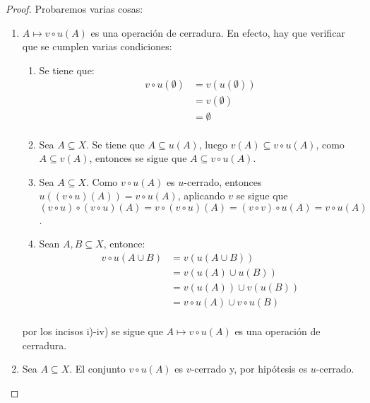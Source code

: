 \documentclass[12pt]{report}
\theoremstyle{largebreak}
\begin{document}
    \begin{proof}
        Probaremos varias cosas:
        \begin{enumerate}
            \item $A\mapsto v\circ u(A)$ es una operación de cerradura. En efecto, hay que verificar que se cumplen varias condiciones:
            \begin{enumerate}
                \item Se tiene que:
                \begin{equation*}
                    \begin{split}
                        v\circ u(\emptyset)&=v(u(\emptyset))\\
                        &=v(\emptyset)\\
                        &=\emptyset\\
                    \end{split}
                \end{equation*}
                \item Sea $A\subseteq X$. Se tiene que $A\subseteq u(A)$, luego $v(A)\subseteq v\circ u(A)$, como $A\subseteq v(A)$, entonces se sigue que $A\subseteq v\circ u(A)$.
                \item Sea $A\subseteq X$. Como $v\circ u(A)$ es $u$-cerrado, entonces $u((v\circ u)(A))=v\circ u(A)$, aplicando $v$ se sigue que $(v\circ u)\circ(v\circ u)(A)=v\circ (v\circ u)(A)=(v\circ v)\circ u(A)=v\circ u(A)$.
                \item Sean $A,B\subseteq X$, entonce:
                \begin{equation*}
                    \begin{split}
                        v\circ u(A\cup B)&=v(u(A\cup B))\\
                        &=v(u(A)\cup u(B))\\
                        &=v(u(A))\cup v(u(B))\\
                        &=v\circ u(A)\cup v\circ u(B)\\
                    \end{split}
                \end{equation*}
            \end{enumerate}
            por los incisos i)-iv) se sigue que $A\mapsto v\circ u(A)$ es una operación de cerradura.

            \item Sea $A\subseteq X$. El conjunto $v\circ u(A)$ es $v$-cerrado y, por hipótesis es $u$-cerrado.
        

\end{enumerate}
\end{proof}
\end{document}

